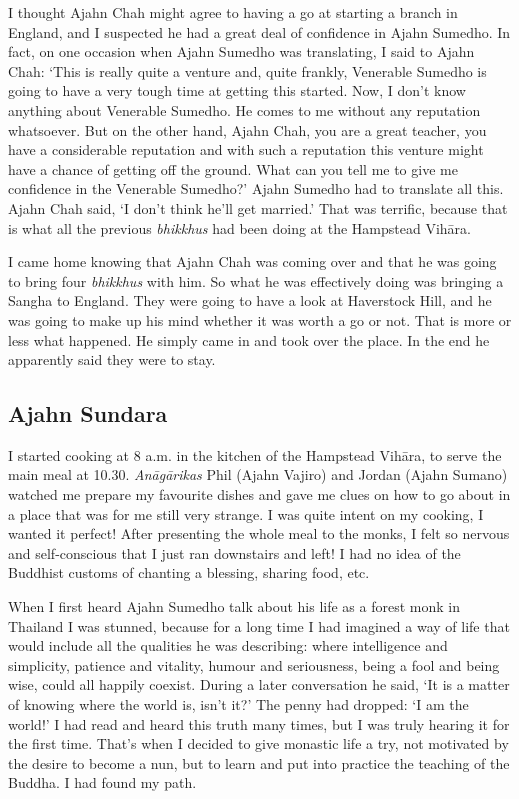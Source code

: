 I thought Ajahn Chah might agree to having a go at starting a branch in
England, and I suspected he had a great deal of confidence in Ajahn
Sumedho. In fact, on one occasion when Ajahn Sumedho was translating, I
said to Ajahn Chah: `This is really quite a venture and, quite frankly, 
Venerable Sumedho is going to have a very tough time at getting this
started. Now, I don't know anything about Venerable Sumedho. He comes to
me without any reputation whatsoever. But on the other hand, Ajahn Chah, 
you are a great teacher, you have a considerable reputation and with
such a reputation this venture might have a chance of getting off the
ground. What can you tell me to give me confidence in the Venerable
Sumedho?' Ajahn Sumedho had to translate all this. Ajahn Chah said, `I
don't think he'll get married.' That was terrific, because that is what
all the previous \emph{bhikkhus} had been doing at the Hampstead Vihāra.

I came home knowing that Ajahn Chah was coming over and that he was
going to bring four \emph{bhikkhus} with him. So what he was effectively doing was
bringing a Sangha to England. They were going to have a look at
Haverstock Hill, and he was going to make up his mind whether it was
worth a go or not. That is more or less what happened. He simply came in
and took over the place. In the end he apparently said they were to
stay. 

\subsection{Ajahn Sundara}

I started cooking at 8 a.m. in the kitchen of the Hampstead Vihāra, to
serve the main meal at 10.30. \emph{Anāgārikas} Phil (Ajahn Vajiro) and
Jordan (Ajahn Sumano) watched me prepare my favourite dishes and gave me
clues on how to go about in a place that was for me still very strange. 
I was quite intent on my cooking, I wanted it perfect! After presenting
the whole meal to the monks, I felt so nervous and self-conscious that I
just ran downstairs and left! I had no idea of the Buddhist customs of
chanting a blessing, sharing food, etc. 

When I first heard Ajahn Sumedho talk about his life as a forest monk in
Thailand I was stunned, because for a long time I had imagined a way of
life that would include all the qualities he was describing: where
intelligence and simplicity, patience and vitality, humour and
seriousness, being a fool and being wise, could all happily coexist. 
During a later conversation he said, `It is a matter of knowing where
the world is, isn't it?' The penny had dropped: `I am the world!' I had
read and heard this truth many times, but I was truly hearing it for the
first time. That's when I decided to give monastic life a try, not
motivated by the desire to become a nun, but to learn and put into
practice the teaching of the Buddha. I had found my path. 

